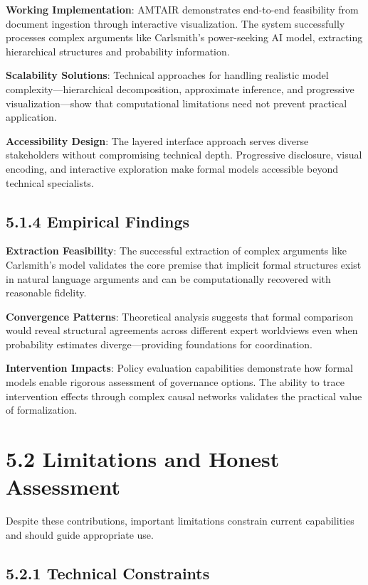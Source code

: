 \documentclass[
  11pt,
  letterpaper,
  openany]{book}
\begin{document}
\textbf{Working Implementation}: AMTAIR demonstrates end-to-end
feasibility from document ingestion through interactive visualization.
The system successfully processes complex arguments like Carlsmith's
power-seeking AI model, extracting hierarchical structures and
probability information.

\textbf{Scalability Solutions}: Technical approaches for handling
realistic model complexity---hierarchical decomposition, approximate
inference, and progressive visualization---show that computational
limitations need not prevent practical application.

\textbf{Accessibility Design}: The layered interface approach serves
diverse stakeholders without compromising technical depth. Progressive
disclosure, visual encoding, and interactive exploration make formal
models accessible beyond technical specialists.

\subsection{5.1.4 Empirical Findings}\label{sec-empirical-findings}

\textbf{Extraction Feasibility}: The successful extraction of complex
arguments like Carlsmith's model validates the core premise that
implicit formal structures exist in natural language arguments and can
be computationally recovered with reasonable fidelity.

\textbf{Convergence Patterns}: Theoretical analysis suggests that formal
comparison would reveal structural agreements across different expert
worldviews even when probability estimates diverge---providing
foundations for coordination.

\textbf{Intervention Impacts}: Policy evaluation capabilities
demonstrate how formal models enable rigorous assessment of governance
options. The ability to trace intervention effects through complex
causal networks validates the practical value of formalization.

\section{5.2 Limitations and Honest
Assessment}\label{sec-limitations-assessment}

Despite these contributions, important limitations constrain current
capabilities and should guide appropriate use.

\subsection{5.2.1 Technical
Constraints}\label{sec-technical-constraints}
\end{document}
